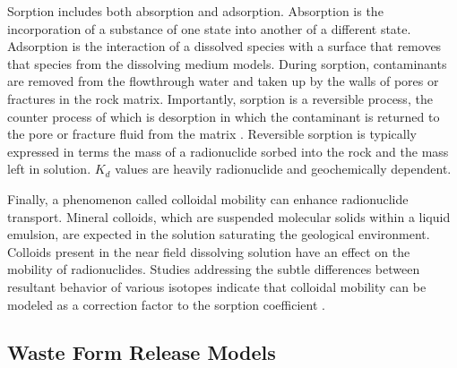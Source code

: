 Sorption includes both absorption and adsorption. Absorption is the 
incorporation of a substance of one state into another of a different state.
Adsorption is the interaction of a dissolved species with a surface that
removes that species from the dissolving medium models. During sorption, 
contaminants are removed from the flowthrough water and taken up by the 
walls of pores or fractures in the rock matrix.  Importantly, sorption is a 
reversible process, the  counter process of which is desorption in which the 
contaminant is returned to the pore or fracture fluid from the matrix
\cite{ahn_mass_1988} . Reversible sorption is typically expressed in terms 
the mass of a radionuclide sorbed into the rock and the mass left in solution. 
$K_d$ values are heavily radionuclide and geochemically dependent.  






Finally, a phenomenon called colloidal mobility can enhance radionuclide 
transport. Mineral colloids, which are suspended molecular solids within a liquid 
emulsion, are expected in the solution saturating the geological environment.
Colloids present in the near field dissolving solution have an effect on the
mobility of radionuclides. Studies addressing the subtle differences between 
resultant behavior of various isotopes indicate that colloidal mobility can be 
modeled as a correction factor to the sorption coefficient 
\cite{bracke_safety_2008}.

\subsection{Waste Form Release Models}

